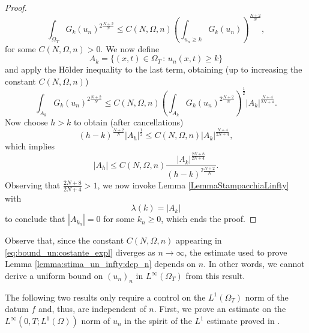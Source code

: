 \documentclass{amsart}
\numberwithin{equation}{section}
\def\elle#1{L^{#1}}
\def\elleom#1{L^{#1}(\Omega)}
\def\elleomT#1{L^{#1}(\Omega_T)}
\newcommand{\abs}[1]{\left|#1\right|}
\begin{document}
\begin{proof}
    \begin{equation}\label{eq:bound_un:costante_expl}
    \int_{\Omega_T}G_k(u_n)^{2\frac{N+2}{N}}\leq C(N,\Omega,n) \left(\int_{u_n\geq k}G_k(u_n)\right)^{\frac{N+2}{N}},
    \end{equation} for some $C(N,\Omega,n)>0$.
    We now define 
    \begin{equation}\label{proof:bounded:def_Ak}
        A_k=\{(x,t)\in\Omega_T\,\colon \,u_n(x,t)\geq k\}
    \end{equation}
    and apply the H\"older inequality to the last term, obtaining (up to increasing the constant $C(N,\Omega,n)$)
    \[
    \int_{A_k}G_k(u_n)^{2\frac{N+2}{N}}\leq C(N,\Omega,n)\left(\int_{A_k}G_k(u_n)^{2\frac{N+2}{N}}\right)^{\frac12}\abs{A_k}^\frac{N+4}{2N+4}.
    \]
    Now choose $h>k$ to obtain (after cancellations)
    $$
    (h-k)^\frac{N+2}{N}\abs{A_h}^\frac{1}{2}\leq C(N,\Omega,n) \abs{A_k}^\frac{N+4}{2N+4},
    $$
    which implies
    $$
    \abs{A_h}\leq C(N,\Omega,n) \frac{\abs{A_k}^\frac{2N+8}{2N+4}}{(h-k)^{2\frac{N+2}{N}}}.
    $$
    Observing that $\frac{2N+8}{2N+4}>1$, we now invoke Lemma \ref{LemmaStampacchiaLinfty} with $$\lambda(k)=\abs{A_k}$$ to conclude that $\abs{A_{k_n}}=0$ for some $k_n\geq0$, which ends the proof. 
\end{proof}

Observe that, since the constant $C(N,\Omega,n)$ appearing in \eqref{eq:bound_un:costante_expl} diverges as $n\to\infty$, the estimate used to prove Lemma \ref{lemma:stima_un_infty:dep_n} depends on $n$. In other words, we cannot derive a uniform bound on $(u_n)_n$ in $\elleomT\infty$ from this result. 

The following two results only require a control on the $\elleomT1$ norm of the datum $f$ and, thus, are independent of $n$. First, we prove an estimate on the $\elle\infty(0,T;\elleom1)$ norm of $u_n$ in the spirit of the $\elle1$ estimate proved in \cite{BoccardoJDE,BO-Kellersegel}.
\end{document}

